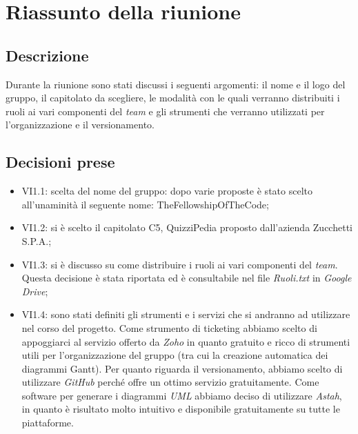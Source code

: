 \section{Riassunto della riunione}
\subsection{Descrizione}

Durante la riunione sono stati discussi i seguenti argomenti: il nome e il logo del gruppo, il capitolato da scegliere, le modalità con le quali verranno distribuiti i ruoli ai vari componenti del \textit{team} e gli strumenti che verranno utilizzati per l'organizzazione e il versionamento.

\subsection{Decisioni prese}
\begin{itemize}
\item VI1.1: scelta del nome del gruppo: dopo varie proposte è stato scelto all'unaminità il seguente nome: TheFellowshipOfTheCode;
\item VI1.2: si è scelto il capitolato C5, QuizziPedia proposto dall'azienda Zucchetti S.P.A.;
\item VI1.3: si è discusso su come distribuire i ruoli ai vari componenti del \textit{team}. Questa decisione è stata riportata ed è consultabile nel file \textsl{Ruoli.txt} in \textit{Google Drive};
\item VI1.4: sono stati definiti gli strumenti e i servizi che si andranno ad utilizzare nel corso del progetto. Come strumento di ticketing abbiamo scelto di appoggiarci al servizio offerto da \textit{Zoho} in quanto gratuito e ricco di strumenti utili per l'organizzazione del gruppo (tra cui la creazione automatica dei diagrammi Gantt). Per quanto riguarda il versionamento, abbiamo scelto di utilizzare \textit{GitHub} perché offre un ottimo servizio gratuitamente. Come software per generare i diagrammi \textit{UML} abbiamo deciso di utilizzare \textit{Astah}, in quanto è risultato molto intuitivo e disponibile gratuitamente su tutte le piattaforme.
\end{itemize}
